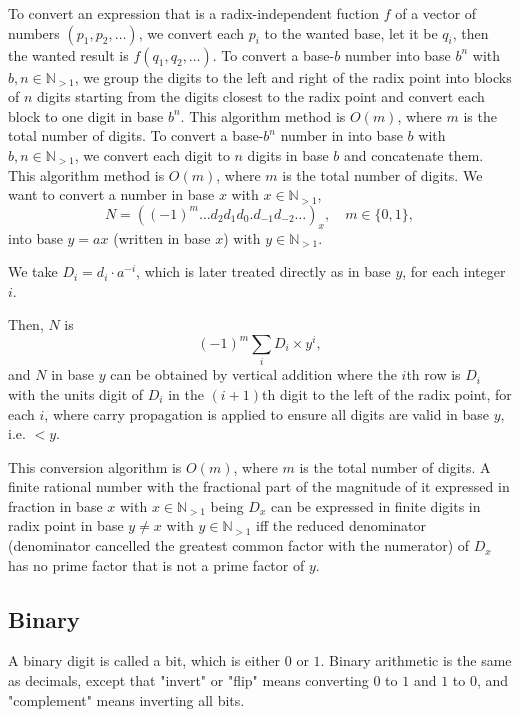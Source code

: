 \documentclass[a4paper,12pt]{report}
\begin{document}
To convert an expression that is a radix-independent fuction $f$ of a vector of numbers $(p_1,p_2,\ldots)$, we convert each $p_i$ to the wanted base, let it be $q_i$, then the wanted result is $f(q_1,q_2,\ldots)$.
To convert a base-$b$ number into base $b^n$ with $b,n\in\mathbb{N}_{>1}$, we group the digits to the left and right of the radix point into blocks of $n$ digits starting from the digits closest to the radix point and convert each block to one digit in base $b^n$. This algorithm method is $O(m)$, where $m$ is the total number of digits.
To convert a base-$b^n$ number in into base $b$ with $b,n\in\mathbb{N}_{>1}$, we convert each digit to $n$ digits in base $b$ and concatenate them. This algorithm method is $O(m)$, where $m$ is the total number of digits.
We want to convert a number in base $x$ with $x\in\mathbb{N}_{>1}$,
\[N=((-1)^m\ldots d_2d_1d_0.d_{-1}d_{-2}\ldots)_x,\quad m\in\{0,1\},\]
into base $y=ax$ (written in base $x$) with $y\in\mathbb{N}_{>1}$.

We take $D_i=d_i\cdot a^{-i}$, which is later treated directly as in base $y$, for each integer $i$.

Then, $N$ is
\[(-1)^m\sum_iD_i\times y^i,\]
and $N$ in base $y$ can be obtained by vertical addition where the $i$th row is $D_i$ with the units digit of $D_i$ in the $(i+1)$th digit to the left of the radix point, for each $i$, where carry propagation is applied to ensure all digits are valid in base $y$, i.e. $<y$.

This conversion algorithm is $O(m)$, where $m$ is the total number of digits.
A finite rational number with the fractional part of the magnitude of it expressed in fraction in base $x$ with $x\in\mathbb{N}_{>1}$ being $D_x$ can be expressed in finite digits in radix point in base $y\neq x$ with $y\in\mathbb{N}_{>1}$ iff the reduced denominator (denominator cancelled the greatest common factor with the numerator) of $D_x$ has no prime factor that is not a prime factor of $y$.
\subsection{Binary}
A binary digit is called a bit, which is either $0$ or $1$. Binary arithmetic is the same as decimals, except that "invert" or "flip" means converting $0$ to $1$ and $1$ to $0$, and "complement" means inverting all bits.
\end{document}
